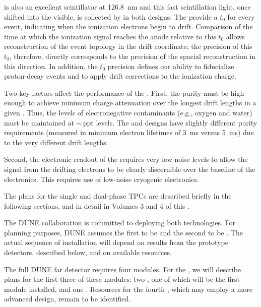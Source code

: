  is also an excellent scintillator at \SI{126.8}{\nano\meter} and this fast scintillation light, once shifted into the visible, is collected by  in both designs. The  provide a $t_{0}$ for every event, indicating when the ionization electrons begin to drift. Comparison of the time at which the ionization signal reaches the anode relative to this $t_{0}$ allows reconstruction of the event topology in the drift coordinate; the precision of this $t_{0}$, therefore, directly corresponds to the precision of the spacial reconstruction in this direction. In addition, the $t_{0}$ precision defines our ability to fiducialize proton-decay events and to apply drift corrections to the ionization charge.

Two key factors affect the performance of the  .  First, the  purity must be high enough to achieve minimum charge attenuation over the longest drift lengths in a given .  Thus, the levels of electronegative contaminants (e.g., oxygen and water) must be maintained at $\sim\,$ppt levels.  The  and  designs have slightly different purity requirements (measured in minimum electron lifetimes of \SI{3}{ms} versus \SI{5}{ms}) due to the very different drift lengths.

Second, the electronic readout of the  requires very low noise levels to allow the signal from the drifting electrons to be clearly discernible over the baseline of the electronics.  This requires use of low-noise cryogenic electronics. 

The plans for the single and dual-phase TPCs are described briefly in the following sections, and in detail in Volumes 3 and 4 of this .

The DUNE collaboration is committed to deploying both technologies. 
For planning purposes, DUNE assumes the first  to be
\single and the second to be \dual.
The actual sequence of  installation will depend on results from the prototype detectors, described below, and on available resources.

The full DUNE far detector requires four modules. For the , we will describe plans for the first three of these modules: two , one of which will be the first module installed, and one . Resources for the fourth , which may employ a more advanced design, remain to be identified. 

